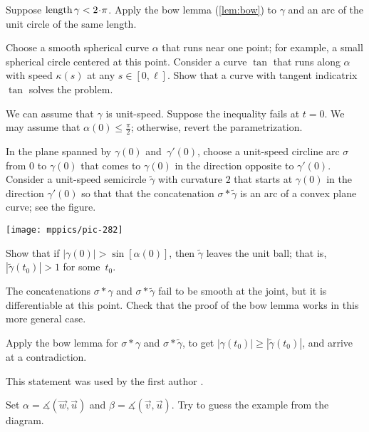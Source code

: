 \begin{multicols}{2}
Suppose $\length\gamma<2\cdot\pi$. 
Apply the bow lemma (\ref{lem:bow}) to $\gamma$ and an arc of the unit circle of the same length.

Choose a smooth spherical curve $\alpha$ that runs near one point;
for example, a small spherical circle centered at this point.
Consider a curve $\tan$ that runs along $\alpha$ with speed $\kappa(s)$ at any $s\in [0,\ell]$.
Show that a curve with tangent indicatrix $\tan$ solves the problem.

We can assume that $\gamma$ is unit-speed.
Suppose the inequality fails at $t=0$.
We may assume that $\alpha(0)\le\tfrac\pi2$;
otherwise, revert the parametrization.

In the plane spanned by $\gamma(0)$ and~$\gamma'(0)$, choose a unit-speed circline arc $\sigma$ from $0$ to $\gamma(0)$ that comes to $\gamma(0)$ in the direction opposite to $\gamma'(0)$.
Consider a unit-speed semicircle $\tilde\gamma$ with curvature $2$
that starts at $\gamma(0)$ in the direction $\gamma'(0)$ so that that the concatenation $\sigma*\tilde\gamma$ is an arc of a convex plane curve; see the figure.

\begin{Figure}
\vskip-1mm
\centering
\texttt{[image: mppics/pic-282]}
\vskip-1mm
\end{Figure}

Show that if $|\gamma(0)|> \sin[\alpha(0)]$, then $\tilde\gamma$ leaves the unit ball; that is, $|\tilde\gamma(t_0)|>1$ for some~$t_0$.

The concatenations $\sigma*\gamma$ and $\sigma*\tilde\gamma$ fail to be smooth at the joint, but it is differentiable at this point.
Check that the proof of the bow lemma works in this more general case.

Apply the bow lemma for $\sigma*\gamma$ and $\sigma*\tilde\gamma$, to get $|\gamma(t_0)|\ge |\tilde\gamma(t_0)|$, and arrive at a contradiction.

 This statement was used by the first author \cite{petrunin2023}.


Set $\alpha=\measuredangle(\vec w,\vec u)$ 
and $\beta=\measuredangle(\vec v,\vec u)$.
Try to guess the example from the diagram.


\end{multicols}
